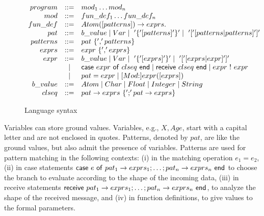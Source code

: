 \documentclass{article}[12pt,a4paper]
\theoremstyle{definition}
\newcommand{\cons}{\mbox{:}}
\begin{document}
\begin{figure}[t]
  \begin{center}
    $
    \begin{array}{rcl@{~~~~~~}l}

      program & ::= & mod_1  \dots  mod_n \\
      mod & ::= & fun\_def_1  \dots fun\_def_n  \\
      fun\_def & ::= & Atom([patterns]) \to exprs.\\
      pat & ::= & b\_value \mid Var \mid ~'\{'[patterns]'\}' \mid ~
                  '['[patterns|patterns] ']'\\
      patterns & ::= & pat ~\{ ','patterns\} \\
      exprs & ::= & expr ~\{ ',' exprs\} \\
      expr & ::= & b\_value \mid Var \mid ~'\{'[exprs]'\}' \mid ~'[' [exprs|expr] ']' \\
                    & \mid & \ms{case}~expr~\ms{of}~clseq~\mathsf{end} \mid
                             \ms{receive}~clseq~\mathsf{end} \mid expr ~ ! ~ expr \\
                    & \mid & pat = expr \mid
                             [Mod\cons]expr([exprs]) \\
      b\_value & ::= & Atom \mid Char \mid Float \mid Integer \mid String \\
      clseq & ::= & pat  \to exprs ~ \{ ';' pat \to exprs  \} \\
    \end{array}
    $
  \end{center}
  \caption{Language syntax} \label{ErlangSyntax}
\end{figure}

Variables can store ground values. Variables, e.g., $X,Age$, start with a capital letter and
are not enclosed in quotes.
Patterns, denoted by $pat$, are like the ground values,
but also admit the presence of variables. Patterns are used for pattern matching in the following contexts: (i) in the matching operation $e_1 = e_2$, (ii) in case statements $\mathsf{case}~e~\mathsf{of}~pat_1 \rightarrow exprs_1; \ldots; pat_n
\rightarrow exprs_n~\mathsf{end}$ to choose the branch
to evaluate according to the shape of the incoming data,
(iii) in receive
statements $\mathsf{receive}~pat_1 \rightarrow exprs_1; \ldots; pat_n
\rightarrow exprs_n~\mathsf{end}$, to analyze the shape of the received message, and
(iv) in function
definitions, to give values to the formal parameters. 
\end{document}
